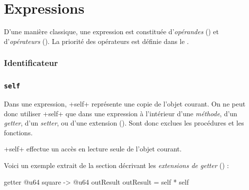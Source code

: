 
\chapter{Expressions}



D'une manière classique, une expression est constituée d'\emph{opérandes} () et d'\emph{opérateurs} (). La priorité des opérateurs est définie dans le .





\subsection{Identificateur}

\subsection{\texttt{self}}

Dans une expression, \ggsq+self+ représente une copie de l'objet courant. On ne peut donc utiliser \ggsq+self+ que dans une expression à l'intérieur d'une \emph{méthode}, d'un \emph{getter}, d'un \emph{setter}, ou d'une extension (). Sont donc exclues les procédures et les fonctions.

\ggsq+self+ effectue un accès en lecture seule de l'objet courant.

Voici un exemple extrait de la section décrivant les \emph{extensions de getter} () :
\begin{galgas4}
getter @u64 square -> @u64 outResult {
  outResult = self * self
}
\end{galgas4}









